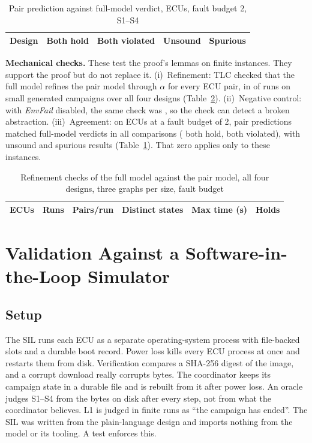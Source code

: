 \documentclass[journal]{IEEEtran}
\begin{document}
\begin{table}[t]
\caption{Pair prediction against full-model verdict, \AgreeSizes{} ECUs, fault budget 2, S1--S4}
\label{tab:agree}
\centering
\footnotesize
\setlength{\tabcolsep}{4pt}
\begin{tabular}{@{}lrrrr@{}}
\toprule
Design & Both hold & Both violated & Unsound & Spurious \\
\midrule

\end{tabular}
\end{table}

\textbf{Mechanical checks.} These test the proof's lemmas on finite instances. They support the proof but do not replace it.
(i)~Refinement: TLC checked that the full model refines the pair model through $\alpha$ for every ECU pair, in \RefineHold{} of \RefineRuns{} runs on small generated campaigns over all four designs (Table~\ref{tab:refine}).
(ii)~Negative control: with \emph{EnvFail} disabled, the same check was \ControlVerdict, so the check can detect a broken abstraction.
(iii)~Agreement: on \AgreeSizes{} ECUs at a fault budget of 2, pair predictions matched full-model verdicts in all \AgreeRuns{} comparisons (\AgreeHolds{} both hold, \AgreeViolated{} both violated), with \AgreeUnsound{} unsound and \AgreeSpurious{} spurious results (Table~\ref{tab:agree}). That zero applies only to these instances.

\begin{table}[t]
\caption{Refinement checks of the full model against the pair model, all four designs, three graphs per size, fault budget \ScaleFaultBudget}
\label{tab:refine}
\centering
\footnotesize
\setlength{\tabcolsep}{3pt}
\begin{tabular}{@{}rrrrrr@{}}
\toprule
ECUs & Runs & Pairs/run & Distinct states & Max time (s) & Holds \\
\midrule

\end{tabular}
\end{table}

\section{Validation Against a Software-in-the-Loop Simulator}
\label{sec:validation}

\subsection{Setup}
The SIL runs each ECU as a separate operating-system process with file-backed slots and a durable boot record. Power loss kills every ECU process at once and restarts them from disk. Verification compares a SHA-256 digest of the image, and a corrupt download really corrupts bytes. The coordinator keeps its campaign state in a durable file and is rebuilt from it after power loss. An oracle judges S1--S4 from the bytes on disk after every step, not from what the coordinator believes. L1 is judged in finite runs as ``the campaign has ended''. The SIL was written from the plain-language design and imports nothing from the model or its tooling. A test enforces this.
\end{document}

